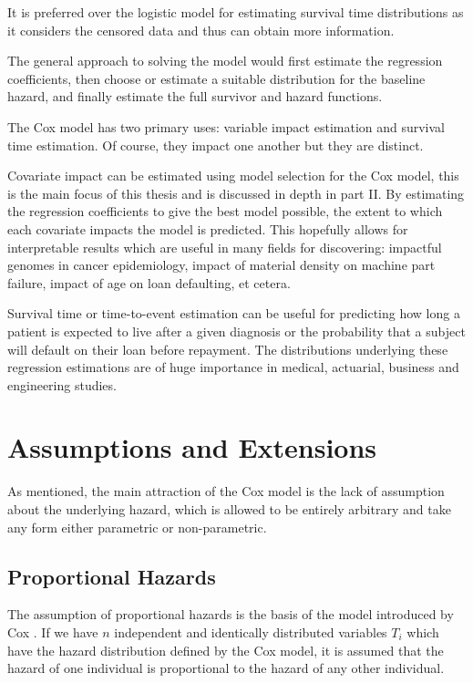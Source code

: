 It is preferred over the logistic model for estimating survival time distributions as it considers the censored data and thus can obtain more information. 

The general approach to solving the model would first estimate the regression coefficients, then choose or estimate a suitable distribution for the baseline hazard, and finally estimate the full survivor and hazard functions.

The Cox model has two primary uses: variable impact estimation and survival time estimation. Of course, they impact one another but they are distinct.

Covariate impact can be estimated using model selection for the Cox model, this is the main focus of this thesis and is discussed in depth in part II. By estimating the regression coefficients to give the best model possible, the extent to which each covariate impacts the model is predicted. This hopefully allows for interpretable results which are useful in many fields for discovering: impactful genomes in cancer epidemiology, impact of material density on machine part failure, impact of age on loan defaulting, et cetera. 

Survival time or time-to-event estimation can be useful for predicting how long a patient is expected to live after a given diagnosis or the probability that a subject will default on their loan before repayment. The distributions underlying these regression estimations are of huge importance in medical, actuarial, business and engineering studies.

\newpage
\section{Assumptions and Extensions}\label{assumptions}

As mentioned, the main attraction of the Cox model is the lack of assumption about the underlying hazard, which is allowed to be entirely arbitrary and take any form either parametric or non-parametric.

\subsection{Proportional Hazards}

The assumption of proportional hazards is the basis of the model introduced by Cox \cite{cox72}. If we have $n$ independent and identically distributed variables $T_i$ which have the hazard distribution defined by the Cox model, it is assumed that the hazard of one individual is proportional to the hazard of any other individual.

